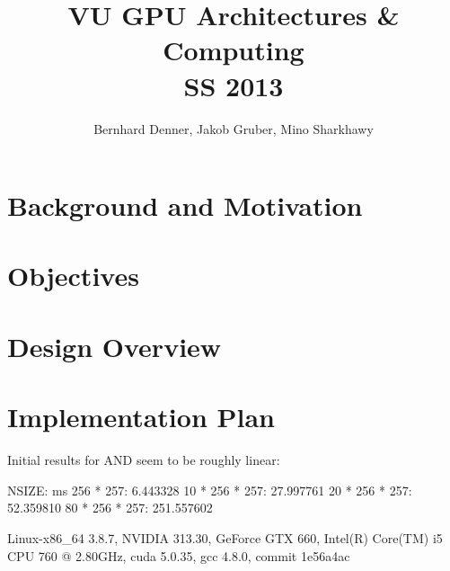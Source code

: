 \documentclass[a4paper,10pt]{article}
\title{
    VU GPU Architectures \& Computing \\
    SS 2013
}
\author{
    Bernhard Denner,
    Jakob Gruber,
    Mino Sharkhawy
}
\begin{document}
\maketitle

\section{Background and Motivation}

\section{Objectives}

\section{Design Overview}

\section{Implementation Plan}

\begin{comments}
Initial results for AND seem to be roughly linear:

NSIZE: ms
256 * 257: 6.443328
10 * 256 * 257: 27.997761
20 * 256 * 257: 52.359810
80 * 256 * 257: 251.557602

Linux-x86_64 3.8.7, NVIDIA 313.30, GeForce GTX 660, Intel(R) Core(TM) i5 CPU 760  @ 2.80GHz,
cuda 5.0.35, gcc 4.8.0, commit 1e56a4ac
\end{comments}
\end{document}
